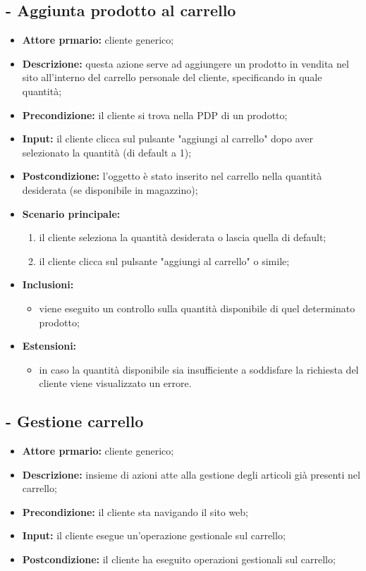 \subsection{ - Aggiunta prodotto al carrello}
\begin{itemize}
    \item \textbf{Attore prmario:} cliente generico;
    \item \textbf{Descrizione:} questa azione serve ad aggiungere un prodotto in vendita nel sito
          all'interno del carrello personale del cliente, specificando in quale quantità;
    \item \textbf{Precondizione:} il cliente si trova nella PDP di un prodotto;
    \item \textbf{Input:} il cliente clicca sul pulsante "aggiungi al carrello" dopo aver selezionato la quantità (di default a 1);
    \item \textbf{Postcondizione:} l'oggetto è stato inserito nel carrello nella quantità desiderata (se disponibile in magazzino);
    \item \textbf{Scenario principale:}
          \begin{enumerate}
              \item il cliente seleziona la quantità desiderata o lascia quella di default;
              \item il cliente clicca sul pulsante "aggiungi al carrello" o simile;
          \end{enumerate}
    \item \textbf{Inclusioni:}
          \begin{itemize}
              \item viene eseguito un controllo sulla quantità disponibile di quel determinato prodotto;
          \end{itemize}
    \item \textbf{Estensioni:}
          \begin{itemize}
              \item in caso la quantità disponibile sia insufficiente a soddisfare la richiesta del cliente viene visualizzato un errore.
          \end{itemize}
\end{itemize}

\stepUserCase
\subsection{ - Gestione carrello}
\begin{itemize}
    \item \textbf{Attore prmario:} cliente generico;
    \item \textbf{Descrizione:} insieme di azioni atte alla gestione degli articoli già presenti nel carrello;
    \item \textbf{Precondizione:} il cliente sta navigando il sito web;
    \item \textbf{Input:} il cliente esegue un'operazione gestionale sul carrello;
    \item \textbf{Postcondizione:} il cliente ha eseguito operazioni gestionali sul carrello;
\end{itemize}

